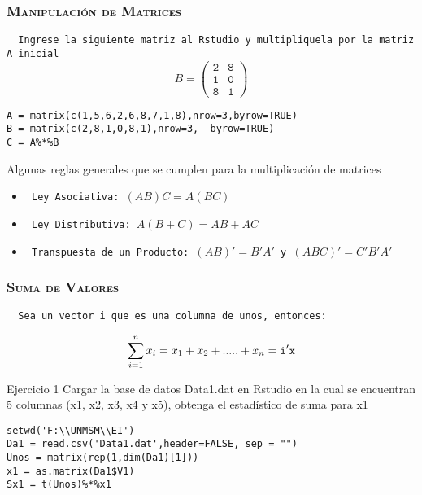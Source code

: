 \documentclass[16.5pt]{beamer}
\begin{document}
{
\begin{frame}
\frametitle{\textsc{\textbf{Manipulación de Matrices}}}
\hspace*{-5mm}
\vspace*{-2mm} 
\vspace{0.3cm}


\texttt{  {\color{red} Ingrese la siguiente matriz al Rstudio y multipliquela por la matriz A inicial} }
$$B= \mathtt{\begin{pmatrix} 2 & 8  \\ 1 & 0 \\ 8 & 1  \end{pmatrix}}$$

\begin{lstlisting}
A = matrix(c(1,5,6,2,6,8,7,1,8),nrow=3,byrow=TRUE)
B = matrix(c(2,8,1,0,8,1),nrow=3,  byrow=TRUE)
C = A%*%B
\end{lstlisting}

Algunas reglas generales que se cumplen para la multiplicación de matrices
\begin{itemize}
\item\texttt{{\color{black} Ley Asociativa:} $(AB)C = A(BC)$} 
\item \texttt{{ \color{black} Ley Distributiva:} $A(B+C) = AB + AC$} 
\item \texttt{{ \color{black} Transpuesta de un Producto:} $(AB)' = B'A'$ y $(ABC)' = C'B'A'$ } 


\end{itemize}
\end{frame}
}
{
\begin{frame}
\frametitle{\textsc{\textbf{Suma de Valores}}}
\hspace*{-5mm}
\vspace*{-5mm} 
\vspace{0.5cm}


\texttt{  {\color{blue} Sea un vector i que es una columna de unos, entonces:} }

$$\sum_{i=1}^n x_i = x_1 + x_2 + .....+ x_n = \color{black} \mathtt{i'x}$$



\begin{bclogo}{Ejercicio 1}
 {\small\color{blue} Cargar la base de datos Data1.dat en Rstudio en la cual se encuentran 5 columnas (x1, x2, x3, x4 y x5), obtenga el estadístico de suma para x1}
\begin{lstlisting}
setwd('F:\\UNMSM\\EI')
Da1 = read.csv('Data1.dat',header=FALSE, sep = "")
Unos = matrix(rep(1,dim(Da1)[1]))
x1 = as.matrix(Da1$V1)
Sx1 = t(Unos)%*%x1

\end{lstlisting}
\end{bclogo}

\end{frame}
}
\end{document}
